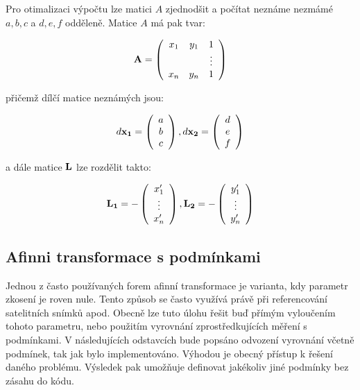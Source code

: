 Pro otimalizaci výpočtu lze matici $A$ zjednodšit a počítat neznáme nezmámé
$a,b,c$ a $d,e,f$ odděleně. Matice $A$  má pak tvar:

$$
{\bf A}=
\left(
\begin{array}{cccccc}
x_{1} & y_{1} & 1   \\
    &       & \vdots    \\
x_{n} & y_{n} & 1   \\
\end{array}
\right)
$$

přičemž dílčí matice neznámých jsou:

$$ d{\bf x_1} =
\left(
\begin{array}{c}
a\\
b\\
c
\end{array}
\right), 
d{\bf x_2} =
\left(
\begin{array}{c}
d\\
e\\
f
\end{array}
\right) $$ 

a dále matice ${\bf L}$ lze rozdělit takto:

\begin{eqnarray}
{\bf L_1} = -\left(
\begin{array}{c}
x'_{1}\\
\vdots \\
x'_{n}\\
\end{array}
\right), 
{\bf L_2} = -\left(
\begin{array}{c}
y'_{1}\\ 
\vdots \\
y'_{n}
\end{array}
\right) 
\end{eqnarray}

\subsection{Afinni transformace s podmínkami}

Jednou z často používaných forem afinní transformace je varianta, kdy
parametr zkosení je roven nule. Tento způsob se často využívá právě při
referencování satelitních snímků apod. Obecně lze tuto úlohu řešit buď přímým
vyloučením tohoto parametru, nebo použitím vyrovnání zprostředkujících měření
s podmínkami. V následujících odstavcích bude popsáno odvození vyrovnání
včetně podmínek, tak jak bylo implementováno. Výhodou je obecný přístup k
řešení daného problému. Výsledek pak umožňuje definovat jakékoliv jiné podmínky
bez zásahu do kódu.

